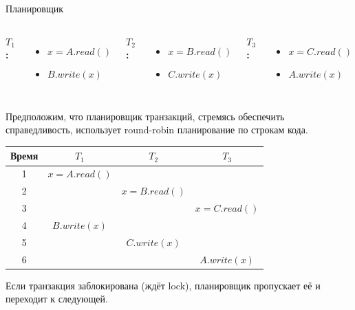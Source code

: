 \documentclass{beamer}
\begin{document}

\begin{frame}{Планировщик}

\begin{columns}
\textbf{$T_1$:}
\begin{itemize}
    \item $x = A.read()$
    \item $B.write(x)$
\end{itemize}

\textbf{$T_2$:}
\begin{itemize}
    \item $x = B.read()$
    \item $C.write(x)$
\end{itemize}

\textbf{$T_3$:}
\begin{itemize}
    \item $x = C.read()$
    \item $A.write(x)$
\end{itemize}
\end{columns}

\vspace{0.7em}

Предположим, что планировщик транзакций, стремясь обеспечить справедливость,
использует round-robin планирование по строкам кода.

\begin{center}
\begin{tabular}{c|c|c|c}
\textbf{Время} & \textbf{$T_1$} & \textbf{$T_2$} & \textbf{$T_3$} \\ \hline
1 & $x = A.read()$ &  &  \\
2 &  & $x = B.read()$ &  \\
3 &  &  & $x = C.read()$ \\
4 & $B.write(x)$ &  &  \\
5 &  & $C.write(x)$ &  \\
6 &  &  & $A.write(x)$ \\
\end{tabular}
\end{center}

\vspace{0.5em}

Если транзакция заблокирована (ждёт lock), планировщик пропускает её
и переходит к следующей.

\end{frame}
\end{document}
